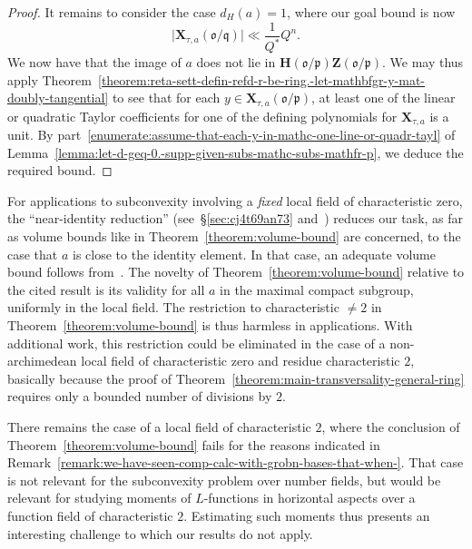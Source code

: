 \documentclass[reqno]{amsart}
\theoremstyle{plain} \newtheorem{theorem} {Theorem} \newtheorem{conjecture} {Conjecture} \newtheorem{corollary} [theorem] {Corollary} \newtheorem{proposition} [theorem] {Proposition} \newtheorem{fact} [theorem] {Fact}
\theoremstyle{definition} \newtheorem{definition} [theorem] {Definition}
\theoremstyle{itplain} %
\newcommand{\mfq}{\mathfrak{q}}
\begin{document}
\begin{proof}
  It remains to consider the case $d_H(a) = 1$, where our goal bound is now
  \begin{equation*}
    \lvert \mathbf{X}_{\tau,a}(\mathfrak{o}/\mfq) \rvert \ll
    \frac{1}{Q^*} Q^n.
  \end{equation*}
  We now have that the image of $a$ does not lie in $\mathbf{H}(\mathfrak{o}/\mathfrak{p}) \mathbf{Z}(\mathfrak{o}/\mathfrak{p})$.  We may thus apply Theorem~\ref{theorem:reta-sett-defin-refd-r-be-ring.-let-mathbfgr-y-mat-doubly-tangential} to see that for each $y \in \mathbf{X}_{\tau,a}(\mathfrak{o}/\mathfrak{p})$, at least one of the linear or quadratic Taylor coefficients for one of the defining polynomials for $\mathbf{X}_{\tau,a}$ is a unit.  By part~\eqref{enumerate:assume-that-each-y-in-mathc-one-line-or-quadr-tayl} of Lemma~\ref{lemma:let-d-geq-0.-supp-given-subs-mathc-subs-mathfr-p}, we deduce the required bound.
\end{proof}


\begin{remark}
  For applications to subconvexity involving a \emph{fixed} local field of characteristic zero, the ``near-identity reduction'' (see~\S\ref{sec:cj4t69an73} and~\cite[\S15.6]{2020arXiv201202187N}) reduces our task, as far as volume bounds like in Theorem~\ref{theorem:volume-bound} are concerned, to the case that $a$ is close to the identity element.  In that case, an adequate volume bound follows from~\cite[Theorem 15.2]{2020arXiv201202187N}.  The novelty of Theorem~\ref{theorem:volume-bound} relative to the cited result is its validity for all $a$ in the maximal compact subgroup, uniformly in the local field.  The restriction to characteristic $\neq 2$ in Theorem~\ref{theorem:volume-bound} is thus harmless in applications.  With additional work, this restriction could be eliminated in the case of a non-archimedean local field of characteristic zero and residue characteristic $2$, basically because the proof of Theorem~\ref{theorem:main-transversality-general-ring} requires only a bounded number of divisions by $2$.

  There remains the case of a local field of characteristic $2$, where the conclusion of Theorem~\ref{theorem:volume-bound} fails for the reasons indicated in Remark~\ref{remark:we-have-seen-comp-calc-with-grobn-bases-that-when-}.  That case is not relevant for the subconvexity problem over number fields, but would be relevant for studying moments of $L$-functions in horizontal aspects over a function field of characteristic $2$.  Estimating such moments thus presents an interesting challenge to which our results do not apply.
\end{remark}
\end{document}

